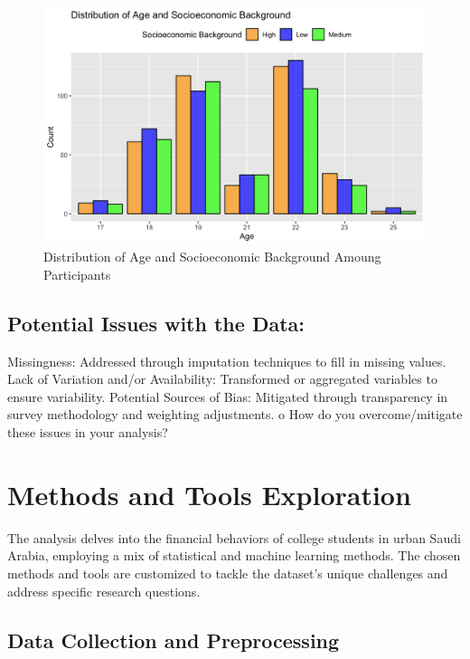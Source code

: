 \documentclass[
]{article}
\begin{document}
\begin{figure}
\centering
\includegraphics{Distribution_of_Age_and_Socioeconomic_Background.png}
\caption{Distribution of Age and Socioeconomic Background Amoung
Participants}
\end{figure}

\hypertarget{potential-issues-with-the-data}{%
\subsection{Potential Issues with the
Data:}\label{potential-issues-with-the-data}}

Missingness: Addressed through imputation techniques to fill in missing
values. Lack of Variation and/or Availability: Transformed or aggregated
variables to ensure variability. Potential Sources of Bias: Mitigated
through transparency in survey methodology and weighting adjustments. o
How do you overcome/mitigate these issues in your analysis?

\hypertarget{methods-and-tools-exploration}{%
\section{Methods and Tools
Exploration}\label{methods-and-tools-exploration}}

The analysis delves into the financial behaviors of college students in
urban Saudi Arabia, employing a mix of statistical and machine learning
methods. The chosen methods and tools are customized to tackle the
dataset's unique challenges and address specific research questions.

\hypertarget{data-collection-and-preprocessing}{%
\subsection{Data Collection and
Preprocessing}\label{data-collection-and-preprocessing}}
\end{document}
